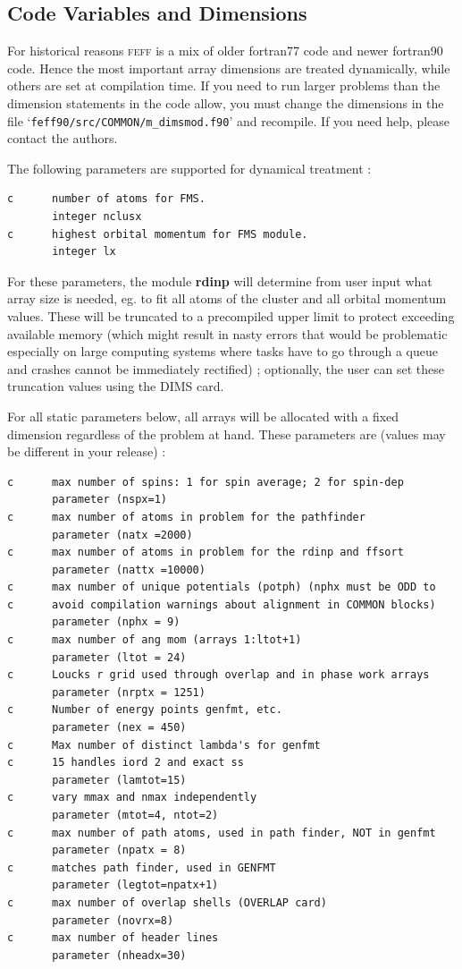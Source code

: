 \documentclass[11pt,oneside]{report} %
\renewcommand{\htmlref}[2]{\hyperlink{#2}{#1}}
\newcommand{\program}[1]{\textsc{#1}}
\newcommand{\feff}{\program{feff}}
\newcommand{\file}[1]{`\texttt{#1}'}
\newcommand{\module}[1]{\textrm{\bf{#1}}}
\renewcommand{\htmlref}[2]{{#1}} %
\begin{document}
\begin{latexonly}

\chapter{Code Variables and Dimensions}
\label{sec:Append-D-Code}
For historical reasons {\feff} is a mix of older fortran77 code and newer
fortran90 code. Hence the most important array dimensions are treated dynamically,
while others are set at compilation time.  If you need
to run larger problems than the dimension statements in the code
allow, you must change the dimensions in the file \file{feff90/src/COMMON/m\_dimsmod.f90} and recompile.
If you need help, please contact the authors.


The following parameters are supported for dynamical treatment :
\begin{verbatim}
c      number of atoms for FMS.
       integer nclusx
c      highest orbital momentum for FMS module.
       integer lx
\end{verbatim}

For these parameters, the module \module{rdinp} will determine from user input what array size is needed, eg.
to fit all atoms of the cluster and all orbital momentum values.  These will be truncated to a precompiled upper
limit to protect exceeding available memory (which might result in nasty errors that would be problematic
especially on large computing systems where tasks have to go through a queue and crashes cannot be immediately
rectified) ; optionally, the user can set these truncation values using the \htmlref{DIMS}{card:dim} card.

For all static parameters below, all arrays will be allocated with a fixed dimension regardless of the
problem at hand.  These parameters are (values may be different in your release) :


\begin{verbatim}
c      max number of spins: 1 for spin average; 2 for spin-dep
       parameter (nspx=1)
c      max number of atoms in problem for the pathfinder
       parameter (natx =2000)
c      max number of atoms in problem for the rdinp and ffsort
       parameter (nattx =10000)
c      max number of unique potentials (potph) (nphx must be ODD to 
c      avoid compilation warnings about alignment in COMMON blocks)
       parameter (nphx = 9)
c      max number of ang mom (arrays 1:ltot+1)
       parameter (ltot = 24)
c      Loucks r grid used through overlap and in phase work arrays
       parameter (nrptx = 1251)
c      Number of energy points genfmt, etc.
       parameter (nex = 450)
c      Max number of distinct lambda's for genfmt
c      15 handles iord 2 and exact ss
       parameter (lamtot=15)
c      vary mmax and nmax independently
       parameter (mtot=4, ntot=2)
c      max number of path atoms, used in path finder, NOT in genfmt
       parameter (npatx = 8)
c      matches path finder, used in GENFMT
       parameter (legtot=npatx+1)
c      max number of overlap shells (OVERLAP card)
       parameter (novrx=8)
c      max number of header lines
       parameter (nheadx=30)
       

\end{verbatim}
\end{latexonly}
\end{document}
